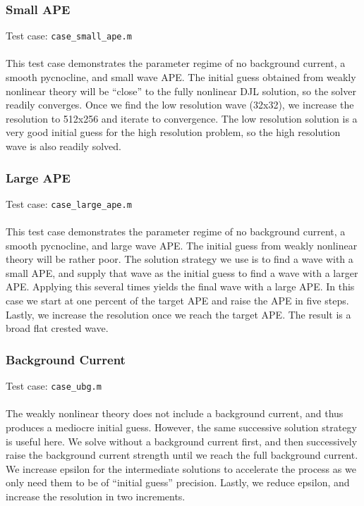 \documentclass[letterpaper]{article}
\begin{document}
\subsubsection{Small APE}
Test case: \verb"case_small_ape.m" \\\\
This test case demonstrates the parameter regime of no background current, a smooth pycnocline, and small wave APE.
The initial guess obtained from weakly nonlinear theory will be ``close'' to the fully nonlinear DJL solution, so the solver readily converges.
Once we find the low resolution wave (32x32), we increase the resolution to 512x256 and iterate to convergence.
The low resolution solution is a very good initial guess for the high resolution problem, so the high resolution wave is also readily solved.

\subsubsection{Large APE}
Test case: \verb"case_large_ape.m" \\\\
This test case demonstrates the parameter regime of no background current, a smooth pycnocline, and large wave APE.
The initial guess from weakly nonlinear theory will be rather poor. 
The solution strategy we use is to find a wave with a small APE, and supply that wave as the initial guess to find a wave with a larger APE.
Applying this several times yields the final wave with a large APE.
In this case we start at one percent of the target APE and raise the APE in five steps.
Lastly, we increase the resolution once we reach the target APE.
The result is a broad flat crested wave.

\subsubsection{Background Current}
Test case: \verb"case_ubg.m" \\\\
The weakly nonlinear theory does not include a background current, and thus produces a mediocre initial guess.
However, the same successive solution strategy is useful here.
We solve without a background current first, and then successively raise the background current strength until we reach the full background current.
We increase epsilon for the intermediate solutions to accelerate the process as we only need them to be of ``initial guess'' precision.
Lastly, we reduce epsilon, and increase the resolution in two increments.
\end{document}
